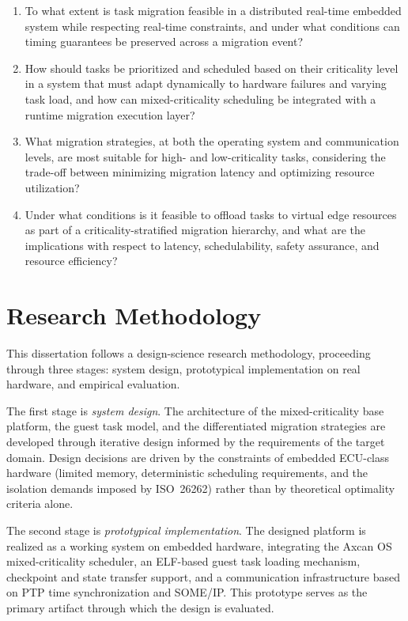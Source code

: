 \begin{enumerate}
	\item[\textbf{RQ1.}] To what extent is task migration feasible in a distributed
	real-time embedded system while respecting real-time constraints, and under what
	conditions can timing guarantees be preserved across a migration event?
	
	\item[\textbf{RQ2.}] How should tasks be prioritized and scheduled based on their
	criticality level in a system that must adapt dynamically to hardware failures and
	varying task load, and how can mixed-criticality scheduling be integrated with a
	runtime migration execution layer?
	
	\item[\textbf{RQ3.}] What migration strategies, at both the operating system and
	communication levels, are most suitable for high- and low-criticality tasks,
	considering the trade-off between minimizing migration latency and optimizing
	resource utilization?
	
	\item[\textbf{RQ4.}] Under what conditions is it feasible to offload tasks to
	virtual edge resources as part of a criticality-stratified migration hierarchy,
	and what are the implications with respect to latency, schedulability, safety
	assurance, and resource efficiency?
\end{enumerate}

\section{Research Methodology}
\label{sec:methodology}

This dissertation follows a design-science research methodology, proceeding through
three stages: system design, prototypical implementation on real hardware, and
empirical evaluation.

The first stage is \emph{system design}. The architecture of the mixed-criticality
base platform, the guest task model, and the differentiated migration strategies are
developed through iterative design informed by the requirements of the target domain.
Design decisions are driven by the constraints of embedded ECU-class hardware (limited
memory, deterministic scheduling requirements, and the isolation demands imposed by
ISO~26262) rather than by theoretical optimality criteria alone.

The second stage is \emph{prototypical implementation}. The designed platform is
realized as a working system on embedded hardware, integrating the Axcan OS
mixed-criticality scheduler, an ELF-based guest task loading mechanism, checkpoint
and state transfer support, and a communication infrastructure based on PTP time
synchronization and SOME/IP. This prototype serves as the primary artifact through
which the design is evaluated.

